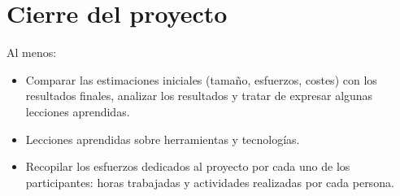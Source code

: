 \section{Cierre del proyecto}
Al menos:
\begin{itemize}
	\item Comparar las estimaciones iniciales (tamaño, esfuerzos, costes) con los resultados finales, analizar los resultados y tratar de expresar algunas lecciones aprendidas.
	\item Lecciones aprendidas sobre herramientas y tecnologías.
	\item Recopilar los esfuerzos dedicados al proyecto por cada uno de los participantes: horas trabajadas y actividades realizadas por cada persona.
\end{itemize}